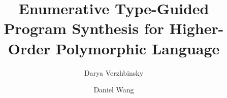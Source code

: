 \documentclass[acmsmall,nonacm]{acmart}
\begin{document}
\title{Enumerative Type-Guided Program Synthesis for Higher-Order Polymorphic Language} %

\author{Darya Verzhbinsky}

\author{Daniel Wang}






\end{document}
